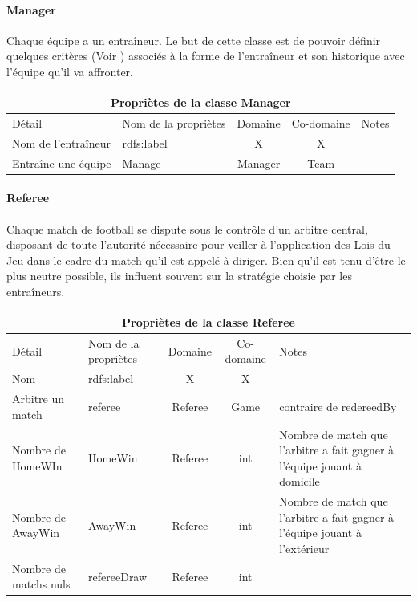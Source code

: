 \documentclass[oneside,13pt,a4paper]{article}
\begin{document}
\paragraph{Manager}

Chaque équipe a un entraîneur. Le but de cette classe est de pouvoir définir quelques critères (Voir ) associés à la forme de l’entraîneur et son historique avec l’équipe qu’il va affronter.

\begin{tabular}{| l | l | c | c | p{3cm} |}
  \hline
  \multicolumn{5}{|c|}{Propriètes de la classe \textbf{Manager}} \\ \hline
  Détail & Nom de la propriètes & Domaine & Co-domaine & Notes \\ \hline
  Nom de l'entraîneur & rdfs:label & X  & X  &  \\ \hline
  Entraîne une équipe & Manage & Manager & Team &  \\
\hline
\end{tabular}

\paragraph{Referee}

Chaque match de football se dispute sous le contrôle d’un arbitre central, disposant de toute l’autorité nécessaire pour veiller à l’application des Lois du Jeu dans le cadre du match qu’il est appelé à diriger. Bien qu'il est tenu d'être le plus neutre possible, ils influent souvent sur la stratégie choisie par les entraîneurs.


\begin{tabular}{| l | l | c | c | p{3cm} |}
  \hline
  \multicolumn{5}{|c|}{Propriètes de la classe \textbf{Referee}} \\ \hline
  Détail & Nom de la propriètes & Domaine & Co-domaine & Notes \\ \hline
  Nom & rdfs:label  & X  &X  &  \\ \hline
  Arbitre un match & referee & Referee & Game & contraire de redereedBy  \\ \hline
  Nombre de HomeWIn & HomeWin & Referee & int  & Nombre de match que l'arbitre a fait gagner à l'équipe jouant à domicile  \\ \hline
  Nombre de AwayWin & AwayWin & Referee & int & Nombre de match que l'arbitre a fait gagner à l'équipe jouant à l'extérieur \\ \hline
  Nombre de matchs nuls & refereeDraw & Referee & int &  \\ 
  \hline
\end{tabular}
\end{document}

